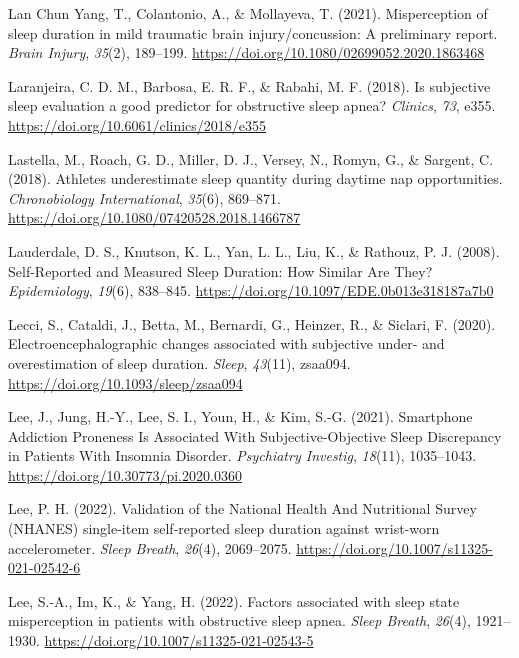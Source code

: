 \documentclass[
]{article}
\newlength{\cslhangindent}
\newenvironment{CSLReferences}[2] %
 {\begin{list}{}{%
  \setlength{\itemindent}{0pt}
  \setlength{\leftmargin}{0pt}
  \setlength{\parsep}{0pt}
  \ifodd #1
   \setlength{\leftmargin}{\cslhangindent}
   \setlength{\itemindent}{-1\cslhangindent}
  \fi
  \setlength{\itemsep}{#2\baselineskip}}}
 {\end{list}}
\begin{document}
\begin{CSLReferences}{1}{0}
Lan Chun Yang, T., Colantonio, A., \& Mollayeva, T. (2021). Misperception of sleep duration in mild traumatic brain injury/concussion: A preliminary report. \emph{Brain Injury}, \emph{35}(2), 189--199. \url{https://doi.org/10.1080/02699052.2020.1863468}

Laranjeira, C. D. M., Barbosa, E. R. F., \& Rabahi, M. F. (2018). Is subjective sleep evaluation a good predictor for obstructive sleep apnea? \emph{Clinics}, \emph{73}, e355. \url{https://doi.org/10.6061/clinics/2018/e355}

Lastella, M., Roach, G. D., Miller, D. J., Versey, N., Romyn, G., \& Sargent, C. (2018). Athletes underestimate sleep quantity during daytime nap opportunities. \emph{Chronobiology International}, \emph{35}(6), 869--871. \url{https://doi.org/10.1080/07420528.2018.1466787}

Lauderdale, D. S., Knutson, K. L., Yan, L. L., Liu, K., \& Rathouz, P. J. (2008). Self-{Reported} and {Measured} {Sleep} {Duration}: {How} {Similar} {Are} {They}? \emph{Epidemiology}, \emph{19}(6), 838--845. \url{https://doi.org/10.1097/EDE.0b013e318187a7b0}

Lecci, S., Cataldi, J., Betta, M., Bernardi, G., Heinzer, R., \& Siclari, F. (2020). Electroencephalographic changes associated with subjective under- and overestimation of sleep duration. \emph{Sleep}, \emph{43}(11), zsaa094. \url{https://doi.org/10.1093/sleep/zsaa094}

Lee, J., Jung, H.-Y., Lee, S. I., Youn, H., \& Kim, S.-G. (2021). Smartphone {Addiction} {Proneness} {Is} {Associated} {With} {Subjective}-{Objective} {Sleep} {Discrepancy} in {Patients} {With} {Insomnia} {Disorder}. \emph{Psychiatry Investig}, \emph{18}(11), 1035--1043. \url{https://doi.org/10.30773/pi.2020.0360}

Lee, P. H. (2022). Validation of the {National} {Health} {And} {Nutritional} {Survey} ({NHANES}) single-item self-reported sleep duration against wrist-worn accelerometer. \emph{Sleep Breath}, \emph{26}(4), 2069--2075. \url{https://doi.org/10.1007/s11325-021-02542-6}

Lee, S.-A., Im, K., \& Yang, H. (2022). Factors associated with sleep state misperception in patients with obstructive sleep apnea. \emph{Sleep Breath}, \emph{26}(4), 1921--1930. \url{https://doi.org/10.1007/s11325-021-02543-5}


\end{CSLReferences}
\end{document}
